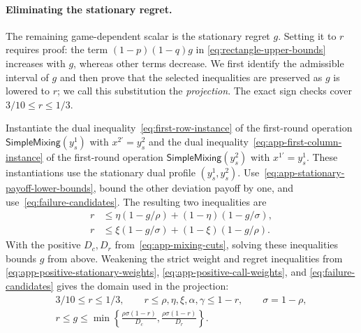 \documentclass[11pt]{article}
\theoremstyle{remark}
\theoremstyle{plain}
\newcommand{\sm}{\mathsf{SimpleMixing}}
\begin{document}
\paragraph{Eliminating the stationary regret.}
The remaining game-dependent scalar is the stationary regret $g$.
Setting it to $r$ requires proof: the term $(1-p)(1-q)g$ in
\eqref{eq:rectangle-upper-bounds} increases with $g$, whereas
other terms decrease. We first identify the admissible interval of
$g$ and then prove that the selected inequalities are preserved as
$g$ is lowered to $r$; we call this substitution the
\emph{projection}. The exact sign checks cover $3/10\le r\le1/3$.

Instantiate the dual inequality~\eqref{eq:first-row-instance}
of the first-round operation $\sm(y_s^1)$ with $x^{2\prime}=y_s^2$
and the dual inequality~\eqref{eq:app-first-column-instance}
of the first-round operation $\sm(y_s^2)$ with $x^{1\prime}=y_s^1$.
These instantiations use the stationary dual profile $(y_s^1,y_s^2)$.
Use~\eqref{eq:app-stationary-payoff-lower-bounds}, bound the other
deviation payoff by one, and use~\eqref{eq:failure-candidates}.
The resulting two inequalities are
\begin{equation}
 \begin{aligned}
 r&\le\eta(1-g/\rho)+(1-\eta)(1-g/\sigma),\\
 r&\le\xi(1-g/\sigma)+(1-\xi)(1-g/\rho).
 \end{aligned}
 \label{eq:app-first-round-g-comparisons}
\end{equation}
With the positive $D_c,D_r$ from~\eqref{eq:app-mixing-cuts},
solving these inequalities bounds $g$ from above.
Weakening the strict weight and regret inequalities from
\eqref{eq:app-positive-stationary-weights},
\eqref{eq:app-positive-call-weights}, and
\eqref{eq:failure-candidates} gives the domain used in the projection:
\begin{equation}
 \begin{gathered}
 3/10\le r\le1/3,\qquad
 r\le\rho,\eta,\xi,\alpha,\gamma\le1-r,\qquad \sigma=1-\rho,\\
 r\le g\le
 \min\left\{\frac{\rho\sigma(1-r)}{D_c},
             \frac{\rho\sigma(1-r)}{D_r}\right\}.
 \end{gathered}
 \label{eq:g-projection-domain}
\end{equation}
\end{document}
